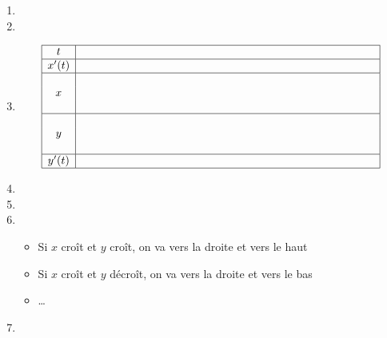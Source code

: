 \begin{frame}
\begin{enumerate}
\item {} 


\pause
\item {} 


\pause
\item {} 
\pause
\vspace*{-1ex}
{\footnotesize
$$\begin{array}{|c|ccccc|}
\hline
t&\qquad&\qquad&\qquad&\qquad&\qquad\\
\hline
x'(t)& & & & &\rule{5cm}{0cm}\\
\hline
 & & & & & \\
x& & & & & \\
 & & & & & \\
\hline
 & & & & & \\
y& & & & & \\
 & & & & & \\
\hline
y'(t)& & & & & \\
\hline
\end{array}
$$}
\vspace*{-1ex}
\pause

\item {} 
\pause

\item {}
\pause

\item {}
\pause
\begin{itemize}
  \item Si $x$ croît et $y$ croît, on va vers la droite et vers le haut 
  \pause
  \item Si $x$ croît et $y$ décroît, on va vers la droite et vers le bas
  
  \item \ldots
\end{itemize}
\pause
\item {}

\end{enumerate}

\end{frame}




